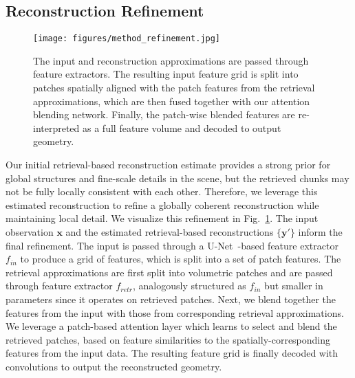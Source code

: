 \subsection{Reconstruction Refinement}
\begin{figure}
	\centering
	\texttt{[image: figures/method\_refinement.jpg]}
	\vspace{-0.7cm}
	\caption{
	The input and reconstruction approximations are passed through feature extractors. 
	The resulting input feature grid is split into patches spatially aligned with the patch features from the retrieval approximations, which are then fused together with our attention blending network. 
	Finally, the patch-wise blended features are re-interpreted as a full feature volume and decoded to output geometry.
	}
	\label{fig:method_refinement}
	\vspace{-0.25cm}
\end{figure}
%
Our initial retrieval-based reconstruction estimate provides a strong prior for  global structures and fine-scale details in the scene, but the retrieved chunks may not be fully locally consistent with each other. Therefore, we leverage this estimated reconstruction to refine a globally coherent reconstruction while maintaining local detail.
%
We visualize this refinement in Fig.~\ref{fig:method_refinement}.
%
The input observation $\mathbf{x}$ and the estimated retrieval-based reconstructions $\{\mathbf{y}'\}$ inform the final refinement. 
The input is passed through a U-Net~\cite{ronneberger2015u}-based feature extractor $f_{in}$ to produce a grid of features, which is split into a set of patch features. The retrieval approximations are first split into volumetric patches and are passed through feature extractor $f_{retr}$, analogously structured as $f_{in}$ but smaller in parameters since it operates on retrieved patches.
Next, we blend together the features from the input with those from corresponding retrieval approximations.
%
We leverage a patch-based attention layer which learns to select and blend the retrieved patches, based on feature similarities to the spatially-corresponding features from the input data.
%
The resulting feature grid is finally decoded with convolutions to output the reconstructed geometry. 
%

